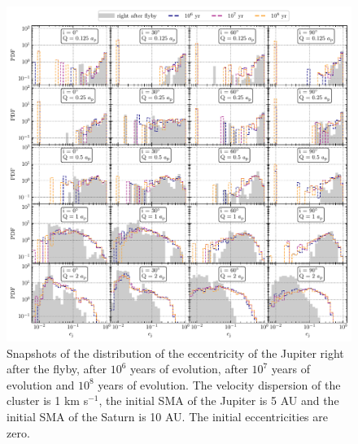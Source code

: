 \documentclass[twocolumn]{aastex63}
\begin{document}
\begin{figure}
    \includegraphics[width=\textwidth]{figs/migration_ej-r2.pdf}
    \caption{Snapshots of the distribution of the eccentricity of the Jupiter right after the flyby, after $10^6$ years of evolution, after $10^7$ years of evolution and $10^8$ years of evolution. The velocity dispersion of the cluster is 1 km s$^{-1}$, the initial SMA of the Jupiter is 5 AU and the initial SMA of the Saturn is 10 AU. The initial eccentricities are zero.}
    \label{fig:hj-ej-s1-r2}
\end{figure}
\end{document}
